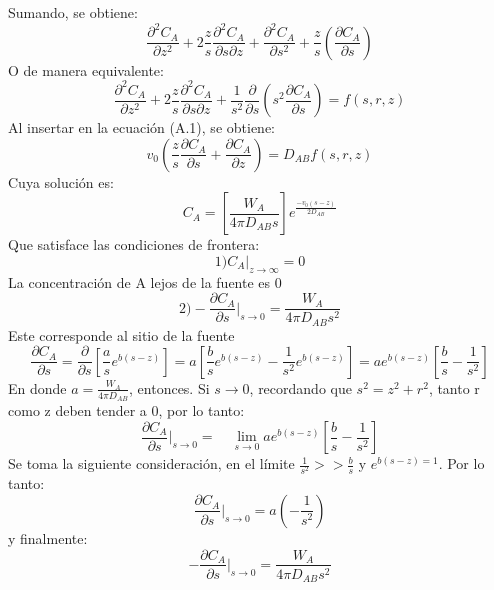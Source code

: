 Sumando, se obtiene:
\begin{equation*}
    \frac{\partial^2C_A}{\partial z^2}+2\frac{z}{s}\frac{\partial^2C_A}{\partial s \partial z}+\frac{\partial^2C_A}{\partial s^2}+\frac{z}{s}(\frac{\partial C_A}{\partial s})
\end{equation*}
O de manera equivalente:
\begin{equation*}
    \frac{\partial^2C_A}{\partial z^2}+2\frac{z}{s}\frac{\partial^2C_A}{\partial s \partial z}+\frac{1}{s^2}\frac{\partial}{\partial s}(s^2\frac{\partial C_A}{\partial s})=f(s,r,z)
\end{equation*}
Al insertar en la ecuación (A.1), se obtiene:
\begin{equation*}
    v_0(\frac{z}{s}\frac{\partial C_A}{\partial s}+\frac{\partial C_A}{\partial z})=D_{AB}f(s,r,z)
\end{equation*}
Cuya solución es:
\begin{equation}
    C_A=[\frac{W_A}{4\pi D_{AB}s}]e^{\frac{-v_0(s-z)}{2D_{AB}}}
\end{equation}
Que satisface las condiciones de frontera:
\begin{equation*}
    1) C_A|_{z \rightarrow \infty}=0 
\end{equation*}
La concentración de A lejos de la fuente es 0
\begin{equation*}
    2) -\frac{\partial C_A}{\partial s}|_{s \rightarrow0}=\frac{W_A}{4\pi D_{AB}s^2}
\end{equation*}
Este corresponde al sitio de la fuente
\begin{equation*}
    \frac{\partial C_A}{\partial s}=\frac{\partial}{\partial s}[\frac{a}{s}e^{b(s-z)}]=a[\frac{b}{s}e^{b(s-z)}-\frac{1}{s^2}e^{b(s-z)}]=ae^{b(s-z)}[\frac{b}{s}-\frac{1}{s^2}]
\end{equation*}
En donde $a=\frac{W_A}{4\pi D_{AB}}$, entonces. Si $s\rightarrow 0$, recordando que $s^2=z^2+r^2$, tanto r como z deben tender a 0, por lo tanto:
\begin{equation*}
    \frac{\partial C_A}{\partial s}|_{s\rightarrow 0}=\quad\lim_{s\rightarrow0}ae^{b(s-z)}[\frac{b}{s}-\frac{1}{s^2}]
\end{equation*}
Se toma la siguiente consideración, en el límite $\frac{1}{s^2}>>\frac{b}{s}$ y $e^{b(s-z)=1}$. Por lo tanto:
\begin{equation*}
     \frac{\partial C_A}{\partial s}|_{s\rightarrow 0}=a(-\frac{1}{s^2})
\end{equation*}
y finalmente:
\begin{equation*}
   -\frac{\partial C_A}{\partial s}|_{s\rightarrow 0}=\frac{W_A}{4\pi D_{AB}s^2} 
\end{equation*}
